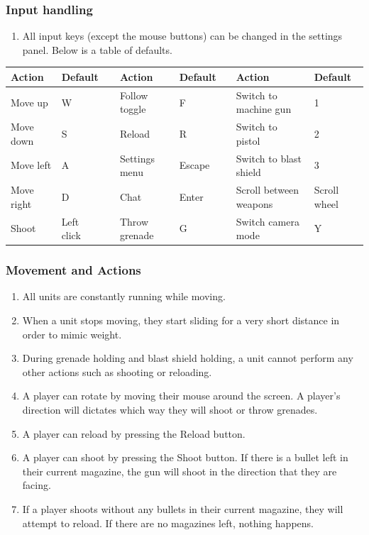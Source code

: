 \documentclass[12pt]{article}
\newenvironment{req} {\begin{enumerate}[leftmargin=2.5cm, label = \textbf{REQ \arabic{subsection}.\arabic{subsubsection}.\arabic*:}]} {\end{enumerate}}
\begin{document}
\subsubsection{Input handling}
\begin{req}
	\item All input keys (except the mouse buttons) can be changed in the settings panel. Below is a table of defaults.
\end{req}
\begin{tabularx}{\textwidth}{|l|l|X|l|l|X|l|l|} \hline
Action & Default && Action & Default && Action & Default\\ \hline
Move up & W & & Follow toggle & F && Switch to machine gun & 1\\ \hline
Move down & S && Reload & R && Switch to pistol & 2\\ \hline
Move left & A && Settings menu & Escape && Switch to blast shield & 3\\ \hline
Move right & D && Chat & Enter && Scroll between weapons & Scroll wheel\\ \hline
Shoot & Left click && Throw grenade & G && Switch camera mode & Y\\ \hline
\end{tabularx}
\subsubsection{Movement and Actions}
\begin{req}
	\item All units  are constantly running while moving. 
	\item When a unit stops moving, they start sliding for a very short distance in order to mimic weight.
	\item During grenade holding and blast shield holding, a unit cannot perform any other actions such as shooting or reloading.
	\item A player can rotate by moving their mouse around the screen. A player's direction will dictates which way they will shoot or throw grenades.
	\item A player can reload by pressing the Reload button.
	\item A player can shoot by pressing the Shoot button. If there is a bullet left in their current magazine, the gun will shoot in the direction that they are facing.
	\item If a player shoots without any bullets in their current magazine, they will attempt to reload. If there are no magazines left, nothing happens.
\end{req}
\end{document}
